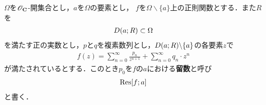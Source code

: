 	\begin{screen}
		\begin{dfn}[留数]
			$\Omega$を$\mathscr{O}_{\mathbf{C}}$-開集合とし，$a$を$\Omega$の要素とし，
			$f$を$\Omega \backslash \{a\}$上の正則関数とする．また$R$を
			\begin{align}
				D(a;R) \subset \Omega
			\end{align}
			を満たす正の実数とし，$p$と$q$を複素数列とし，$D(a;R) \backslash \{a\}$の各要素$z$で
			\begin{align}
				f(z) = \sum_{n=0}^{\infty} \frac{p_{n}}{z^{n+1}} + \sum_{n=0}^{\infty} q_{n} \cdot z^{n}
			\end{align}
			が満たされているとする．このとき$p_{0}$を$f$の$a$における{\bf 留数}と呼び
			\begin{align}
				\operatorname*{Res}[f;a]
			\end{align}
			と書く．
		\end{dfn}
	\end{screen}
	
	
	
	\begin{screen}
		\begin{thm}[留数定理]
		\end{thm}
	\end{screen}